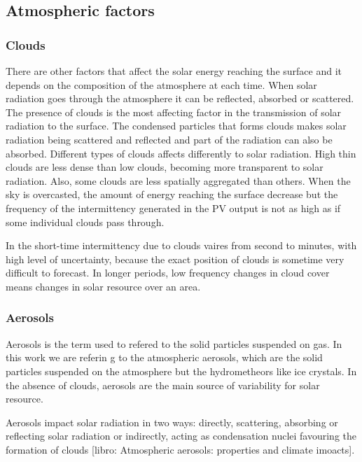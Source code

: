 \subsection{Atmospheric factors}

\subsubsection{Clouds}

There are other factors that affect the solar energy reaching the surface and it depends on the composition of the atmosphere at each time. When solar radiation goes through the atmosphere it can be reflected, absorbed or scattered. The presence of clouds is the most affecting factor in the transmission of solar radiation to the surface. The condensed particles that forms clouds makes solar radiation being scattered and reflected and part of the radiation can also be absorbed. Different types of clouds affects differently to solar radiation. High thin clouds are less dense than low clouds, becoming more transparent to solar radiation. Also, some clouds are less spatially aggregated than others. When the sky is overcasted, the amount of energy reaching the surface decrease but the frequency of the intermittency generated in the PV output is not as high as if some individual clouds pass through.

In the short-time intermittency due to clouds vaires from second to minutes, with high level of uncertainty, because the exact position of clouds is sometime very difficult to forecast. In longer periods, low frequency changes in cloud cover means changes in solar resource over an area.

\subsubsection{Aerosols}

Aerosols is the term used to refered to the solid particles suspended on gas. In this work we are referin g to the atmospheric aerosols, which are the solid particles suspended on the atmosphere but the hydrometheors like ice crystals. In the absence of clouds, aerosols are the main source of variability for solar resource. 

Aerosols impact solar radiation in two ways: directly, scattering, absorbing or reflecting solar radiation or indirectly, acting as condensation nuclei favouring the formation of clouds [libro: Atmospheric aerosols: properties and climate imoacts].

